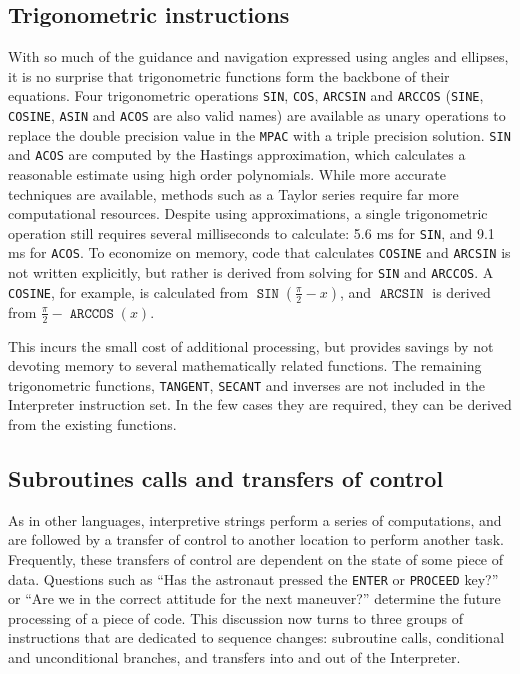 \documentclass[refcap, oxford]{ahsan}
\begin{document}
\subsection{Trigonometric instructions}
With so much of the guidance and navigation expressed using angles and ellipses, it is no surprise that trigonometric functions form the backbone of their equations. Four trigonometric operations \texttt{SIN}, \texttt{COS}, \texttt{ARCSIN} and \texttt{ARCCOS} (\texttt{SINE}, \texttt{COSINE}, \texttt{ASIN} and \texttt{ACOS} are also valid names) are available as unary operations to replace the double precision value in the \texttt{MPAC} with a triple precision solution. \texttt{SIN} and \texttt{ACOS} are computed by the Hastings approximation, which calculates a reasonable estimate using high order polynomials. While more accurate techniques are available, methods such as a Taylor series require far more computational resources. Despite using approximations, a single trigonometric operation still requires several milliseconds to calculate: 5.6 ms for \texttt{SIN}, and 9.1 ms for \texttt{ACOS}. To economize on memory, code that calculates \texttt{COSINE} and \texttt{ARCSIN} is not written explicitly, but rather is derived from solving for \texttt{SIN} and \texttt{ARCCOS}. A \texttt{COSINE}, for example, is calculated from $\operatorname{\texttt{SIN}}\left(\frac{\pi}{2}-x\right)$, and $\operatorname{\texttt{ARCSIN}}$ is derived from $\frac{\pi}{2}-\operatorname{\texttt{ARCCOS}}(x)$.

This incurs the small cost of additional processing, but provides savings by not devoting memory to several mathematically related functions. The remaining trigonometric functions, \texttt{TANGENT}, \texttt{SECANT} and inverses are not included in the Interpreter instruction set. In the few cases they are required, they can be derived from the existing functions.


\subsection{Subroutines calls and transfers of control}
As in other languages, interpretive strings perform a series of computations, and are followed by a transfer of control to another location to perform another task. Frequently, these transfers of control are dependent on the state of some piece of data. Questions such as ``Has the astronaut pressed the \texttt{ENTER} or \texttt{PROCEED} key?'' or ``Are we in the correct attitude for the next maneuver?'' determine the future processing of a piece of code. This discussion now turns to three groups of instructions that are dedicated to sequence changes: subroutine calls, conditional and unconditional branches, and transfers into and out of the Interpreter.
\end{document}
